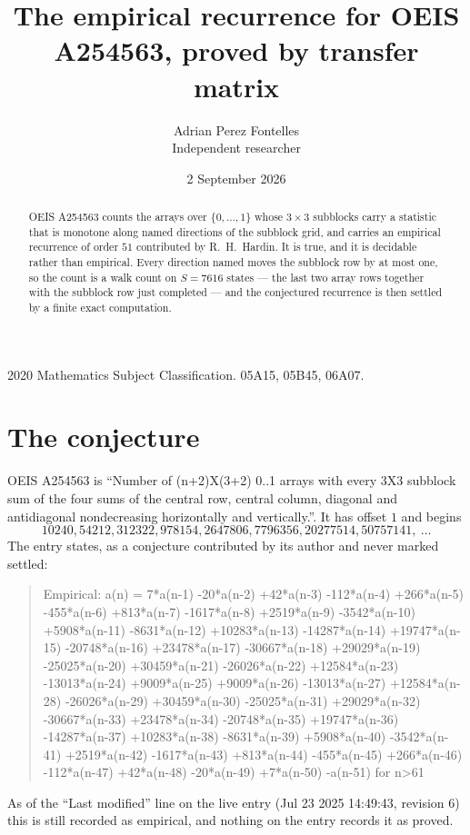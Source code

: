 \documentclass[11pt,a4paper]{article}
\title{The empirical recurrence for OEIS A254563, proved by transfer matrix}
\author{Adrian Perez Fontelles\\ \small Independent researcher}
\date{2 September 2026}
\theoremstyle{plain}
\theoremstyle{definition}
\begin{document}
\maketitle

\begin{abstract}
OEIS A254563 counts the arrays over $\{0,\dots,1\}$ whose $3\times3$ subblocks carry a
statistic that is monotone along named directions of the subblock grid, and carries an
empirical recurrence of order $51$ contributed by R.~H.~Hardin. It is true, and it is
decidable rather than empirical. Every direction named moves the subblock row by at most one,
so the count is a walk count on $S=7616$ states --- the last two array rows together with the
subblock row just completed --- and the conjectured recurrence is then settled by a finite
exact computation.
\end{abstract}

\noindent\small 2020 Mathematics Subject Classification. 05A15, 05B45, 06A07.\normalsize

\section{The conjecture}

OEIS A254563 is ``Number of (n+2)X(3+2) 0..1 arrays with every 3X3 subblock sum of the four sums of the central row, central column, diagonal and antidiagonal nondecreasing horizontally and vertically.''. It has offset $1$ and begins
\[
10240, 54212, 312322, 978154, 2647806, 7796356, 20277514, 50757141,\ \dots
\]
The entry states, as a conjecture contributed by its author and never marked settled:
\begin{quote}
Empirical: a(n) = 7*a(n-1) -20*a(n-2) +42*a(n-3) -112*a(n-4) +266*a(n-5) -455*a(n-6) +813*a(n-7) -1617*a(n-8) +2519*a(n-9) -3542*a(n-10) +5908*a(n-11) -8631*a(n-12) +10283*a(n-13) -14287*a(n-14) +19747*a(n-15) -20748*a(n-16) +23478*a(n-17) -30667*a(n-18) +29029*a(n-19) -25025*a(n-20) +30459*a(n-21) -26026*a(n-22) +12584*a(n-23) -13013*a(n-24) +9009*a(n-25) +9009*a(n-26) -13013*a(n-27) +12584*a(n-28) -26026*a(n-29) +30459*a(n-30) -25025*a(n-31) +29029*a(n-32) -30667*a(n-33) +23478*a(n-34) -20748*a(n-35) +19747*a(n-36) -14287*a(n-37) +10283*a(n-38) -8631*a(n-39) +5908*a(n-40) -3542*a(n-41) +2519*a(n-42) -1617*a(n-43) +813*a(n-44) -455*a(n-45) +266*a(n-46) -112*a(n-47) +42*a(n-48) -20*a(n-49) +7*a(n-50) -a(n-51) for n>61
\end{quote}
As of the ``Last modified'' line on the live entry (Jul 23 2025 14:49:43, revision 6) this is still
recorded as empirical, and nothing on the entry records it as proved.
\end{document}
